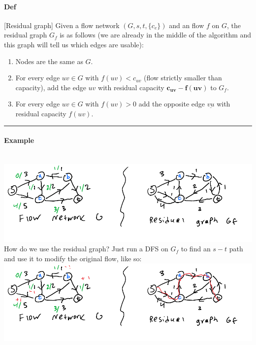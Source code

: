 \documentclass[12 pt]{article}
\begin{document}
        \paragraph{Def} [Residual graph] Given a flow network
        $(G,s,t,\{c_e\})$ and an flow $f$ on $G$, the residual graph
        $G_f$ is as follows (we are already in the middle of the
        algorithm and this graph will tell us which edges are usable):
        \begin{enumerate}
        \item Nodes are the same as $G$.
        \item For every edge $uv \in G$ with $f(uv)<c_{uv}$ (flow
          strictly smaller than capacity), add the edge $uv$ with
          residual capacity $\mathbf{c_{uv}-f(uv)}$ to $G_f$.
        \item For every edge $uv \in G$ with $f(uv)>0$ add the
          opposite edge $\underline{vu}$ with residual capacity $f(uv)$.
        \end{enumerate}
        \rule{\textwidth}{0.5 pt}
        \paragraph{Example} ~ \\
        \includegraphics[width=\textwidth]{i10.pdf}
        \\ How do we use the residual graph? Just run a DFS on $G_f$
        to find an $s-t$ path and use it to modify the original flow,
        like so:
        \\ \includegraphics[width=\textwidth]{i11.pdf}
\end{document}
